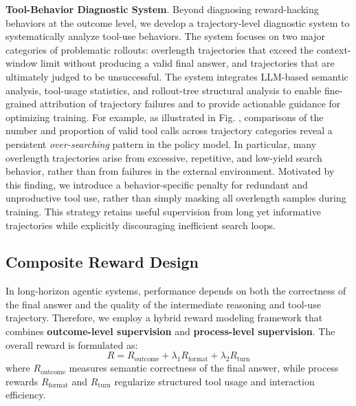 \documentclass{huawei}
\begin{document}
\textbf{Tool-Behavior Diagnostic System}.
Beyond diagnosing reward-hacking behaviors at the outcome level, we develop a trajectory-level diagnostic system to systematically analyze tool-use behaviors. The system focuses on two major categories of problematic rollouts: overlength trajectories that exceed the context-window limit without producing a valid final answer, and trajectories that are ultimately judged to be unsuccessful. The system integrates LLM-based semantic analysis, tool-usage statistics, and rollout-tree structural analysis to enable fine-grained attribution of trajectory failures and to provide actionable guidance for optimizing training.
For example, as illustrated in Fig. , comparisons of the number and proportion of valid tool calls across trajectory categories reveal a persistent \emph{over-searching} pattern in the policy model. In particular, many overlength trajectories arise from excessive, repetitive, and low-yield search behavior, rather than from failures in the external environment. Motivated by this finding, we introduce a behavior-specific penalty for redundant and unproductive tool use, rather than simply masking all overlength samples during training. This strategy retains useful supervision from long yet informative trajectories while explicitly discouraging inefficient search loops.



\subsection{Composite Reward Design}
In long-horizon agentic systems, performance depends on both the correctness of the final answer and the quality of the intermediate reasoning and tool-use trajectory. Therefore, we employ a hybrid reward modeling framework that combines \textbf{outcome-level supervision} and \textbf{process-level supervision}. The overall reward is formulated as:
\begin{equation}
R = R_{\text{outcome}} + \lambda_1 R_{\text{format}} + \lambda_2 R_{\text{turn}}
\end{equation}
where $R_{\text{outcome}}$ measures semantic correctness of the final answer, while process rewards $R_{\text{format}}$ and $R_{\text{turn}}$ regularize structured tool usage and interaction efficiency.
\end{document}
